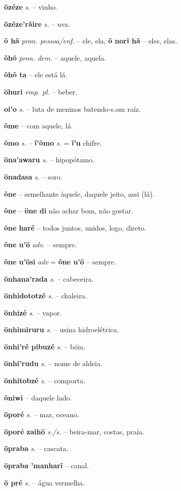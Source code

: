 \textbf{özéze} \textit{s.} -- vinho.

\textbf{özéze'rãire} \textit{s.} -- uva.

\textbf{õ hã} \textit{pron. pessoa/enf.} -- ele, ela, \textbf{õ norĩ hã} -- eles, elas.

\textbf{õhõ} \textit{pron. dem.} -- aquele, aquela.

\textbf{õhõ ta} -- ele está lá.

\textbf{öhuri} \textit{vmp. pl.} -- beber.

\textbf{oi'o} \textit{s.} -- luta de meninos batendo-s.om raíz.

\textbf{õme} -- com aquele, lá.

\textbf{õmo} \textit{s.} -- \textbf{ĩ'õmo} \textit{s.} = \textbf{ĩ'u} chifre.

\textbf{öna'awaru} \textit{s.} -- hipopótamo.

\textbf{önadasa} \textit{s.} -- soro.

\textbf{õne} -- semelhante àquele, daquele jeito, assi (lá).

\textbf{õne} -- \textbf{öne di} não achar bom, não gostar.

\textbf{õne haré} -- todos juntos, unidos, logo, direto.

\textbf{õne u'ö} \textit{adv.} -- sempre.

\textbf{õne u'ösi} \textit{adv} = \textbf{õne u'ö} -- sempre.

\textbf{önhana'rada} \textit{s.} -- cabeceira.

\textbf{önhidototzé} \textit{s.} -- chaleira.

\textbf{önhizé} \textit{s.} -- vapor.

\textbf{önhimiruru} \textit{s.} -- usina hidroelétrica.

\textbf{önhi'ré pibuzé} \textit{s.} -- bóia.

\textbf{önhi'rudu} \textit{s.} -- nome de aldeia.

\textbf{önhitobzé} \textit{s.} -- comporta.

\textbf{õniwi} -- daquele lado.

\textbf{öporé} \textit{s.} -- mar, oceano.

\textbf{öporé zaihö} \textit{s./s.} -- beira-mar, costas, praia.

\textbf{öpraba} \textit{s.} -- cascata.

\textbf{öpraba 'manharĩ} -- canal.

\textbf{ö pré} \textit{s.} -- água vermelha.

